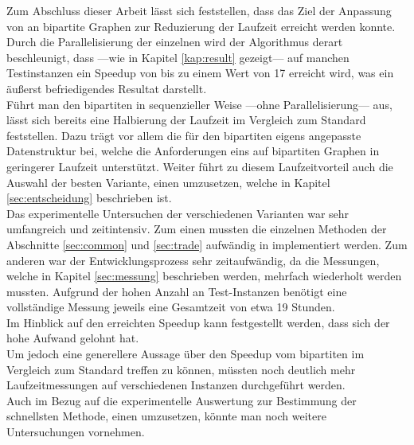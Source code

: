 

Zum Abschluss dieser Arbeit lässt sich feststellen, dass das Ziel 
der Anpassung von \gc{} an bipartite Graphen zur Reduzierung der Laufzeit erreicht werden konnte.
\\

Durch die Parallelisierung der einzelnen  wird der Algorithmus derart beschleunigt, dass ---wie
in Kapitel \ref{kap:result} gezeigt--- auf manchen Testinstanzen ein
Speedup von bis zu einem Wert von 17 erreicht wird, was ein äußerst befriedigendes Resultat darstellt. 
\\

Führt man den bipartiten \gc{} in sequenzieller Weise ---ohne Parallelisierung--- aus, lässt 
sich bereits eine Halbierung der Laufzeit im Vergleich zum Standard \cb{} feststellen.
Dazu trägt vor allem die 
für den bipartiten \gc{} eigens angepasste Datenstruktur bei, welche die Anforderungen eins  auf bipartiten
Graphen in geringerer Laufzeit unterstützt. 
Weiter führt zu diesem Laufzeitvorteil auch die Auswahl der besten Variante, 
einen \ct{} umzusetzen, welche in Kapitel \ref{sec:entscheidung} beschrieben ist.
\\

Das experimentelle Untersuchen der verschiedenen Varianten war sehr umfangreich und zeitintensiv.
Zum einen mussten die einzelnen Methoden der Abschnitte \ref{sec:common} und \ref{sec:trade} aufwändig in \cpp{}
implementiert werden. Zum anderen war der Entwicklungsprozess sehr zeitaufwändig, 
da die Messungen, welche in Kapitel \ref{sec:messung} beschrieben
werden, mehrfach wiederholt werden mussten.
Aufgrund der hohen Anzahl an Test-Instanzen  benötigt eine vollständige Messung jeweils eine Gesamtzeit 
von etwa 19 Stunden. 
\\

Im Hinblick auf den erreichten Speedup kann festgestellt werden, dass sich der hohe Aufwand 
gelohnt hat.
\\

Um jedoch eine generellere Aussage über den Speedup vom bipartiten \gc{} im Vergleich zum Standard  \gc{}
 treffen zu können, müssten noch deutlich mehr Laufzeitmessungen auf verschiedenen Instanzen
durchgeführt werden.
\\

Auch im Bezug auf die experimentelle Auswertung zur Bestimmung der schnellsten Methode, 
einen \ct{} umzusetzen, könnte man noch weitere Untersuchungen vornehmen.
\\
\\

